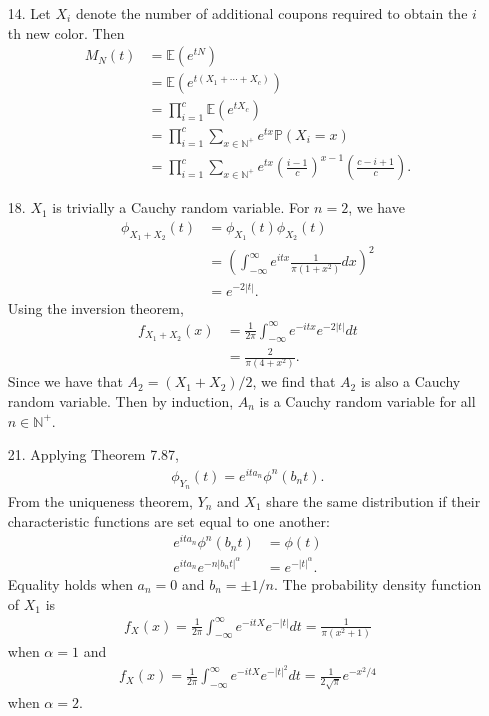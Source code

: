 \documentclass[a4paper,12pt]{article}
\begin{document}
\begin{enumerate}
    \item[14.] 
        Let $X_i$ denote the number of additional coupons required to obtain the $i$th new color. Then
        \begin{align*}
            M_N(t) &= \mathbb{E} \left( e^{tN} \right) \\
            &= \mathbb{E} \left( e^{t(X_1 + \cdots + X_c)} \right) \\
            &= \prod_{i = 1}^c \mathbb{E} \left( e^{tX_c} \right) \\
            &= \prod_{i = 1}^c \sum_{x \in \mathbb{N}^+} e^{tx} \mathbb{P}(X_i = x) \\
            &= \prod_{i = 1}^c \sum_{x \in \mathbb{N}^+} e^{tx} \left( \frac{i - 1}{c} \right)^{x - 1} \left( \frac{c - i + 1}{c} \right).
        \end{align*}

    \item[18.]
        $X_1$ is trivially a Cauchy random variable. For $n = 2$, we have
        \begin{align*}
            \phi_{X_1 + X_2}(t) &= \phi_{X_1}(t) \phi_{X_2}(t) \\
            &= \left( \int_{-\infty}^\infty e^{itx} \frac{1}{\pi (1 + x^2)} dx \right)^2 \\
            &= e^{-2|t|}.
        \end{align*}
        Using the inversion theorem,
        \begin{align*}
            f_{X_1 + X_2}(x) &= \frac{1}{2\pi} \int_{-\infty}^\infty e^{-itx} e^{-2|t|} dt \\
            &= \frac{2}{\pi(4 + x^2)}.
        \end{align*}
        Since we have that $A_2 = (X_1 + X_2) / 2$, we find that $A_2$ is also a Cauchy random variable. Then by induction, $A_n$ is a Cauchy random variable for all $n \in \mathbb{N}^+$.

    \item[21.]
        Applying Theorem 7.87,
        \begin{align*}
            \phi_{Y_n}(t) = e^{ita_n} \phi^n (b_n t).
        \end{align*}
        From the uniqueness theorem, $Y_n$ and $X_1$ share the same distribution if their characteristic functions are set equal to one another: 
        \begin{align*}
            e^{ita_n} \phi^n (b_n t) &= \phi(t) \\
            e^{ita_n} e^{-n|b_n t|^\alpha} &= e^{-|t|^\alpha}.
        \end{align*}
        Equality holds when $a_n = 0$ and $b_n = \pm 1/n$. The probability density function of $X_1$ is
        \begin{align*}
            f_X(x) = \frac{1}{2 \pi} \int_{-\infty}^\infty e^{-itX} e^{-|t|} dt = \frac{1}{\pi(x^2 + 1)}
        \end{align*}
        when $\alpha = 1$ and
        \begin{align*}
            f_X(x) = \frac{1}{2 \pi} \int_{-\infty}^\infty e^{-itX} e^{-|t|^2} dt = \frac{1}{2 \sqrt{\pi}} e^{-x^2 / 4}
        \end{align*}
        when $\alpha = 2$.

\end{enumerate}
\end{document}
